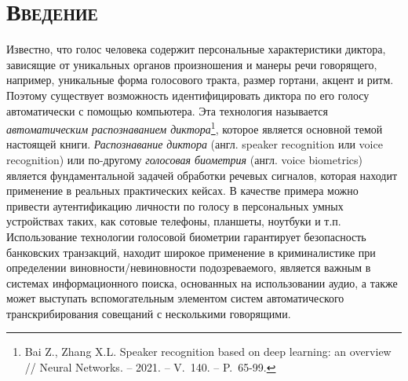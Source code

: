 \documentclass[12pt]{book}
\begin{document}
\chapter{\textsc{Введение}}

\thispagestyle{fancy}

\large{Известно, что голос человека содержит персональные характеристики диктора, зависящие от уникальных органов произношения и манеры речи говорящего, например, уникальные форма голосового тракта, размер гортани, акцент и ритм. Поэтому существует возможность идентифицировать диктора по его голосу автоматически с помощью компьютера. Эта технология называется \textit{автоматическим распознаванием диктора}\footnote{Bai Z., Zhang X.L. Speaker recognition based on deep learning: an overview // Neural Networks. -- 2021. -- V.~140. -- P.~65-99.}, которое является основной темой настоящей книги. \textit{Распознавание диктора} (англ. speaker recognition или voice recognition) или по-другому \textit{голосовая биометрия} (англ. voice biometrics) является фундаментальной задачей обработки речевых сигналов, которая находит применение в реальных практических кейсах. В качестве примера можно привести аутентификацию личности по голосу в персональных умных устройствах таких, как сотовые телефоны, планшеты, ноутбуки и т.п. Использование технологии голосовой биометрии гарантирует безопасность банковских транзакций, находит широкое применение в криминалистике при определении виновности/невиновности подозреваемого, является важным в системах информационного поиска, основанных на использовании аудио, а также может выступать вспомогательным элементом систем автоматического транскрибирования совещаний с несколькими говорящими.}
\end{document}
